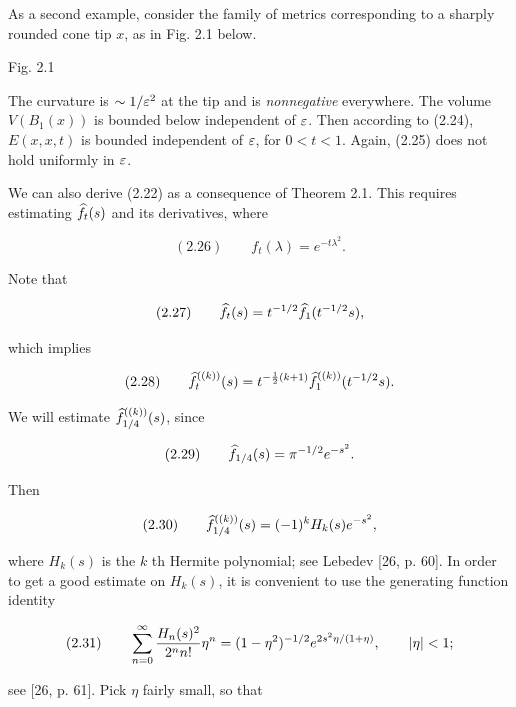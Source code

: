 \begin{example}
As a second example, consider the family of metrics corresponding to a
sharply rounded cone tip $x$, as in Fig. 2.1 below.

\begin{center}
Fig. 2.1
\end{center}

The curvature is $\sim 1/\varepsilon^2$ at the tip and is \emph{nonnegative} everywhere. The volume
$V(B_1(x))$ is bounded below independent of $\varepsilon$. Then according to (2.24),
$E(x,x,t)$ is bounded independent of $\varepsilon$, for $0<t<1$. Again, (2.25) does not
hold uniformly in $\varepsilon$.

We can also derive (2.22) as a consequence of Theorem 2.1. This requires
estimating $\widehat{f}_{t}(s)$ and its derivatives, where

\begin{equation*}
(2.26)\qquad f_t(\lambda)=e^{-t\lambda^2}.
\end{equation*}

Note that

\begin{equation*}
(2.27)\qquad \widehat{f}_{t}(s)=t^{-1/2}\widehat{f}_{1}(t^{-1/2}s),
\end{equation*}

which implies

\begin{equation*}
(2.28)\qquad \widehat{f}_{t}^{((k))}(s)=t^{-\frac12(k+1)}\widehat{f}_{1}^{((k))}(t^{-1/2}s).
\end{equation*}

We will estimate $\widehat{f}_{1/4}^{((k))}(s)$, since

\begin{equation*}
(2.29)\qquad \widehat{f}_{1/4}(s)=\pi^{-1/2}e^{-s^2}.
\end{equation*}

Then

\begin{equation*}
(2.30)\qquad \widehat{f}_{1/4}^{((k))}(s)=(-1)^kH_k(s)e^{-s^2},
\end{equation*}

where $H_k(s)$ is the $k$ th Hermite polynomial; see Lebedev [26, p. 60]. In order
to get a good estimate on $H_k(s)$, it is convenient to use the generating function
identity

\begin{equation*}
(2.31)\qquad \sum_{n=0}^{\infty}\frac{H_n(s)^2}{2^n n!}\eta^n=(1-\eta^2)^{-1/2}e^{2s^2\eta/(1+\eta)}, \qquad |\eta|<1;
\end{equation*}

see [26, p. 61]. Pick $\eta$ fairly small, so that


\end{example}
